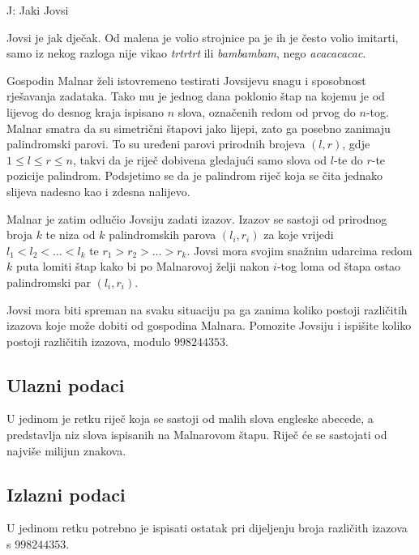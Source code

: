 \begin{statement}[
  timelimit=1 s,
  memorylimit=512 MiB,
]{J: Jaki Jovsi}

Jovsi je jak dječak. Od malena je volio strojnice pa je ih je često volio
imitarti, samo iz nekog razloga nije vikao \textit{trtrtrt} ili
\textit{bambambam}, nego \textit{acacacacac}.

Gospodin Malnar želi istovremeno testirati Jovsijevu snagu i sposobnost
rješavanja zadataka. Tako mu je jednog dana poklonio štap na kojemu je od
lijevog do desnog kraja ispisano $n$ slova, označenih redom od prvog do $n$-tog.
Malnar smatra da su simetrični štapovi jako lijepi, zato ga posebno zanimaju
palindromski parovi. To su uređeni parovi prirodnih brojeva $(l, r)$, gdje
$1 \le l \le r \le n$, takvi da je riječ dobivena gledajući samo slova od $l$-te
do $r$-te pozicije palindrom. Podsjetimo se da je palindrom riječ koja se čita
jednako slijeva nadesno kao i zdesna nalijevo.

Malnar je zatim odlučio Jovsiju zadati izazov. Izazov se sastoji od prirodnog
broja $k$ te niza od $k$ palindromskih parova $(l_i, r_i)$ za koje vrijedi
$l_1 < l_2 < \dots < l_k$ te $r_1 > r_2 > \dots > r_k$. Jovsi mora svojim
snažnim udarcima redom $k$ puta lomiti štap kako bi po Malnarovoj želji nakon
$i$-tog loma od štapa ostao palindromski par $(l_i, r_i)$.

Jovsi mora biti spreman na svaku situaciju pa ga zanima koliko postoji
različitih izazova koje može dobiti od gospodina Malnara. Pomozite Jovsiju i
ispišite koliko postoji različitih izazova, modulo $998244353$.

\subsection*{Ulazni podaci}
U jedinom je retku riječ koja se sastoji od malih slova engleske abecede, a
predstavlja niz slova ispisanih na Malnarovom štapu. Riječ će se sastojati
od najviše milijun znakova.

\subsection*{Izlazni podaci}
U jedinom retku potrebno je ispisati ostatak pri dijeljenju broja različith
izazova s $998244353$.


\end{statement}
